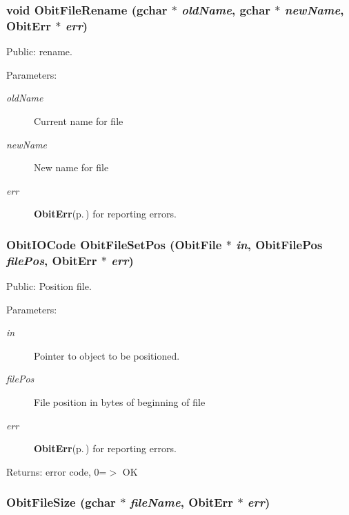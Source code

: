 \subsubsection{\setlength{\rightskip}{0pt plus 5cm}void Obit\-File\-Rename (gchar $\ast$ {\em old\-Name}, gchar $\ast$ {\em new\-Name}, {\bf Obit\-Err} $\ast$ {\em err})}\label{ObitFile_8c_a10}


Public: rename. 

\begin{Desc}
\item[Parameters:]
\begin{description}
\item[{\em old\-Name}]Current name for file \item[{\em new\-Name}]New name for file \item[{\em err}]{\bf Obit\-Err}{\rm (p.\,\pageref{structObitErr})} for reporting errors. \end{description}
\end{Desc}
\subsubsection{\setlength{\rightskip}{0pt plus 5cm}Obit\-IOCode Obit\-File\-Set\-Pos ({\bf Obit\-File} $\ast$ {\em in}, {\bf Obit\-File\-Pos} {\em file\-Pos}, {\bf Obit\-Err} $\ast$ {\em err})}\label{ObitFile_8c_a17}


Public: Position file. 

\begin{Desc}
\item[Parameters:]
\begin{description}
\item[{\em in}]Pointer to object to be positioned. \item[{\em file\-Pos}]File position in bytes of beginning of file \item[{\em err}]{\bf Obit\-Err}{\rm (p.\,\pageref{structObitErr})} for reporting errors. \end{description}
\end{Desc}
\begin{Desc}
\item[Returns:]error code, 0=$>$ OK \end{Desc}
\subsubsection{ Obit\-File\-Size (gchar $\ast$ {\em file\-Name}, {\bf Obit\-Err} $\ast$ {\em err})}\label{ObitFile_8c_a13}


